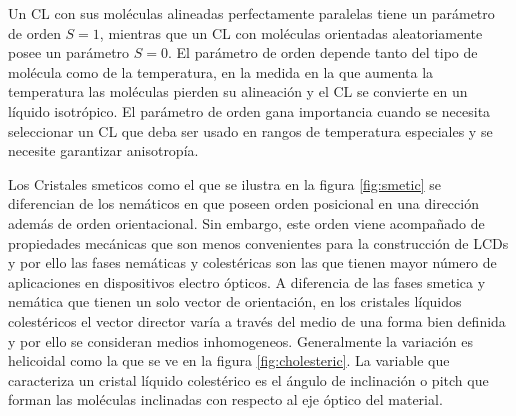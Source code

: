Un CL con sus moléculas alineadas perfectamente paralelas tiene un
parámetro de orden $S=1$, mientras que un CL con moléculas orientadas
aleatoriamente posee un parámetro $S=0$. El parámetro de orden depende
tanto del tipo de molécula como de la temperatura, en la medida en la
que aumenta la temperatura las moléculas pierden su alineación y el CL
se convierte en un líquido isotrópico. El parámetro de orden gana
importancia cuando se necesita seleccionar un CL que deba ser usado en
rangos de temperatura especiales y se necesite garantizar anisotropía.

Los Cristales smeticos como el que se ilustra en la figura
\ref{fig:smetic} se diferencian de los nemáticos en que poseen orden
posicional en una dirección además de orden orientacional. Sin embargo,
este orden viene acompañado de propiedades mecánicas que son menos
convenientes para la construcción de LCDs y por ello las fases
nemáticas y colestéricas son las que tienen mayor número de
aplicaciones en dispositivos electro ópticos. 
A diferencia de las fases smetica y nemática que tienen un solo vector
de orientación, en los cristales líquidos colestéricos el vector
director varía a través del medio de una forma bien
definida y por ello se consideran medios inhomogeneos. Generalmente la
variación es helicoidal como la que se ve en la figura \ref{fig:cholesteric}.   
La variable que caracteriza un cristal líquido colestérico es el
ángulo de inclinación o pitch que forman las moléculas inclinadas con
respecto al eje óptico del material. 
